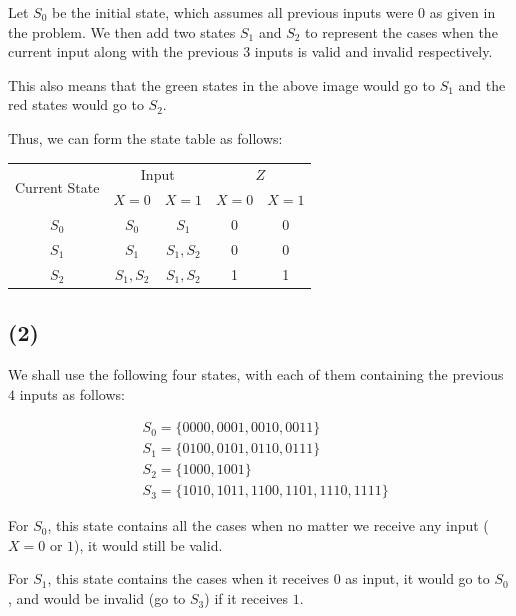 \documentclass{article}
\begin{document}
Let $S_0$ be the initial state, which assumes all previous inputs were $0$ as given in the problem.
We then add two states $S_1$ and $S_2$ to represent the cases when the current input along with the previous $3$ inputs is valid and invalid respectively.

\bigskip
This also means that the green states in the above image would go to $S_1$ and the red states would go to $S_2$.
\bigskip

Thus, we can form the state table as follows:

\begin{table}[H]
    \centering
    \begin{tabular}{|c||c|c||c|c|}
        \hline
        \multirow{2}{*}{Current State} & \multicolumn{2}{c||}{Input} & \multicolumn{2}{c|}{$Z$} \\
        \cline{2-5}
        & $X = 0$ & $X = 1$ & $X = 0$ & $X = 1$ \\
        \hline
        $S_0$ & $S_0$ & $S_1$ & 0 & 0 \\
        \hline
        $S_1$ & $S_1$ & $S_1, S_2$ & 0 & 0 \\
        \hline
        $S_2$ & $S_1, S_2$ & $S_1, S_2$ & 1 & 1 \\
        \hline
    \end{tabular}
\end{table}
\newpage

\subsection*{(2)}

We shall use the following four states, with each of them containing the previous $4$ inputs as follows:

\begin{align*}
    &S_0 = \{0000, 0001, 0010, 0011\} \\
    &S_1 = \{0100, 0101, 0110, 0111\} \\
    &S_2 = \{1000, 1001\} \\
    &S_3 = \{1010, 1011, 1100, 1101, 1110, 1111\}
\end{align*}

For $S_0$, this state contains all the cases when no matter we receive any input ($X = 0$ or $1$), it would still be valid. 
\bigskip

For $S_1$, this state contains the cases when it receives $0$ as input, it would go to $S_0$, and would be invalid (go to $S_3$) if it receives $1$.
\bigskip
\end{document}
